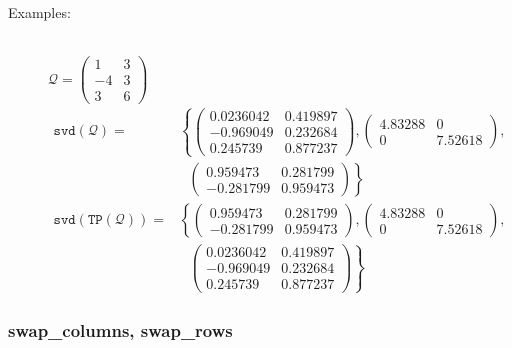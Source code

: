 \begin{description}
\item[Examples:]\mbox{}\\
  \( \mathcal{Q} = \begin{pmatrix} 1 & 3 \\ -4 & 3 \\ 3 & 6 \end{pmatrix}\) \\[2mm]
  \(\begin{aligned}
     \mathtt{svd(\mathcal{Q})} = &
       \left\{
         \begin{pmatrix} 0.0236042 & 0.419897 \\ -0.969049 & 0.232684 \\ 0.245739 & 0.877237 \end{pmatrix},
         \begin{pmatrix}  4.83288 & 0 \\ 0 & 7.52618 \end{pmatrix}, \right.  \\
         & \left. \: \; \,
           \begin{pmatrix} 0.959473 & 0.281799 \\ - 0.281799 & 0.959473 \end{pmatrix}
       \right\} \\[2mm]
      \mathtt{svd(TP(\mathcal{Q}))} = &
       \left\{
         \begin{pmatrix} 0.959473 & 0.281799 \\ - 0.281799 & 0.959473 \end{pmatrix},
         \begin{pmatrix}  4.83288 & 0 \\ 0 & 7.52618 \end{pmatrix}, \right.  \\
         & \left. \: \; \,
         \begin{pmatrix} 0.0236042 & 0.419897 \\ -0.969049 & 0.232684 \\ 0.245739 & 0.877237 \end{pmatrix}
       \right\}
    \end{aligned}\)
\end{description}


\subsubsection{swap\_columns, swap\_rows}
\label{linalg:swap_columns}

